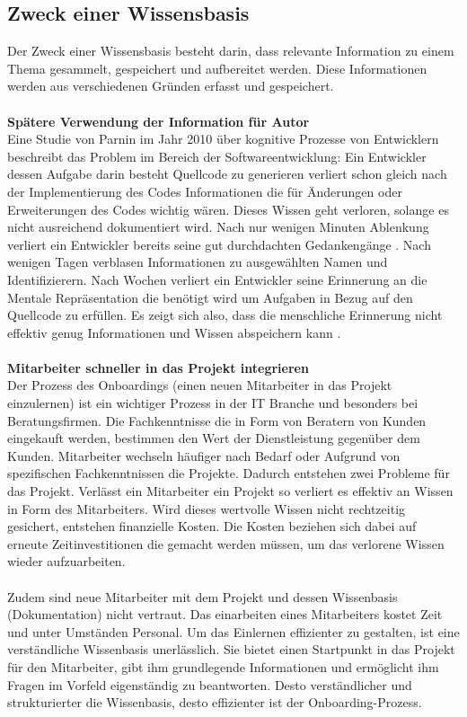 \documentclass[a4paper,12pt,twoside]{scrartcl}
\begin{document}
\subsection{Zweck einer Wissensbasis}
Der Zweck einer Wissensbasis besteht darin, dass relevante Information zu einem Thema gesammelt, gespeichert und aufbereitet werden. Diese Informationen werden aus verschiedenen Gründen erfasst und gespeichert.
\\\\
\textbf{Spätere Verwendung der Information für Autor}\\
Eine Studie von Parnin im Jahr 2010 \cite{Parnin2010} über kognitive Prozesse von Entwicklern beschreibt das Problem im Bereich der Softwareentwicklung: Ein Entwickler dessen Aufgabe darin besteht Quellcode zu generieren verliert schon gleich nach der Implementierung des Codes Informationen die für Änderungen oder Erweiterungen des Codes wichtig wären. Dieses Wissen geht verloren, solange es nicht ausreichend dokumentiert wird. Nach nur wenigen Minuten Ablenkung verliert ein Entwickler bereits seine gut durchdachten Gedankengänge \cite{Graham2004}. Nach wenigen Tagen verblasen Informationen zu ausgewählten Namen und Identifizierern. Nach Wochen verliert ein Entwickler seine Erinnerung an die Mentale Repräsentation die benötigt wird um Aufgaben in Bezug auf den Quellcode zu erfüllen. Es zeigt sich also, dass die menschliche Erinnerung nicht effektiv genug Informationen und Wissen abspeichern kann \cite{Graham2004}.
\\\\
\textbf{Mitarbeiter schneller in das Projekt integrieren}\\
Der Prozess des Onboardings (einen neuen Mitarbeiter in das Projekt einzulernen) ist ein wichtiger Prozess in der IT Branche und besonders bei Beratungsfirmen. Die Fachkenntnisse die in Form von Beratern von Kunden eingekauft werden, bestimmen den Wert der Dienstleistung gegenüber dem Kunden. Mitarbeiter wechseln häufiger nach Bedarf oder Aufgrund von spezifischen Fachkenntnissen die Projekte. Dadurch entstehen zwei Probleme für das Projekt. Verlässt ein Mitarbeiter ein Projekt so verliert es effektiv an Wissen in Form des Mitarbeiters. Wird dieses wertvolle Wissen nicht rechtzeitig gesichert, entstehen finanzielle Kosten. Die Kosten beziehen sich dabei auf erneute Zeitinvestitionen die gemacht werden müssen, um das verlorene Wissen wieder aufzuarbeiten.
\\\\
Zudem sind neue Mitarbeiter mit dem Projekt und dessen Wissenbasis (Dokumentation) nicht vertraut. Das einarbeiten eines Mitarbeiters kostet Zeit und unter Umständen Personal. Um das Einlernen effizienter zu gestalten, ist eine verständliche Wissenbasis unerlässlich. Sie bietet einen Startpunkt in das Projekt für den Mitarbeiter, gibt ihm grundlegende Informationen und ermöglicht ihm Fragen im Vorfeld eigenständig zu beantworten. Desto verständlicher und strukturierter die Wissenbasis, desto effizienter ist der Onboarding-Prozess.   
\end{document}
